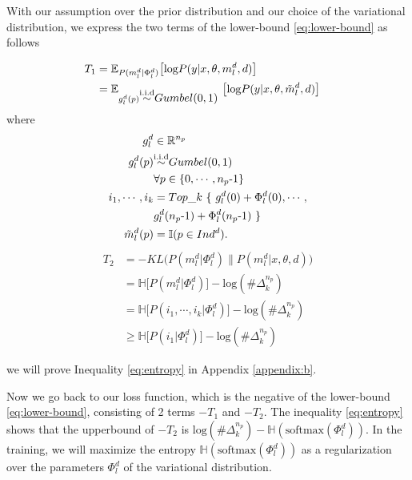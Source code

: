 \documentclass[11pt]{article}
\begin{document}
With our assumption over the prior distribution and our choice of the variational distribution, we express the two terms of the lower-bound \eqref{eq:lower-bound} as follows

\begin{align}
\hspace{-2.em}
T_1 &= \mathbb{E}_{P(m_l^d | \Phi_l^d)} \big[ \text{log} P(y | x,\theta,m_l^d, d)  \big] \nonumber \\
&= \mathbb{E}_{g_l^d(p) \displaystyle{\mathop{\sim}^{\text{i.i.d}}} Gumbel(0,1) \ } \big[ \text{log} P(y | x,\theta,\tilde{m}_l^d,d) \big] \nonumber
\end{align}
where
\begin{align}
\hspace{-2.em}
g_l^d & \in \mathbb{R}^{n_p} \nonumber \\
g_l^d(p) & \displaystyle{\mathop{\sim}^{\text{i.i.d}}} Gumbel(0,1) \nonumber \\
& \forall p \in \{ 0,\cdots,n_p\text{-}1 \} \nonumber \\
i_1, \cdots, i_k &= Top\_k \ \{ \ g_l^d(0) + \Phi_l^d(0), \cdots, \label{eq:top-k} \\ 
&g_l^d(n_p\text{-}1) + \Phi_l^d(n_p\text{-}1) \ \} \nonumber \\
\tilde{m}_l^d(p) &= \mathbb{I}(p \in Ind^d). \nonumber 
\end{align}
%
\begin{align}
T_2 &= - KL \big( P(m_l^d | \Phi_l^d) \parallel P(m_l^d | x,\theta,d) \big) \nonumber \\ 
	&= \mathbb{H} \big[ P(m_l^d | \Phi_l^d) \big] - \text{log}(\#\Delta^{n_p}_k) \nonumber \\ 
	&= \mathbb{H} \big[ P(i_1,\cdots,i_k | \Phi_l^d) \big] - \text{log}(\#\Delta^{n_p}_k) \nonumber \\ \
	&\geqslant \mathbb{H} \big[ P(i_1 | \Phi_l^d) \big] - \text{log}(\#\Delta^{n_p}_k) \label{eq:entropy}
\end{align}

we will prove Inequality \eqref{eq:entropy} in Appendix \ref{appendix:b}.

Now we go back to our loss function, which is the negative of the lower-bound \eqref{eq:lower-bound}, consisting of 2 terms $-T_1$ and $-T_2$. The inequality \eqref{eq:entropy} shows that the upperbound of $-T_2$ is $\text{log}(\#\Delta^{n_p}_k) - \mathbb{H}(\text{softmax}(\Phi_l^d))$. In the training, we will maximize the entropy $\mathbb{H}(\text{softmax}(\Phi_l^d))$ as a regularization over the parameters $\Phi_l^d$ of the variational distribution.
\end{document}
